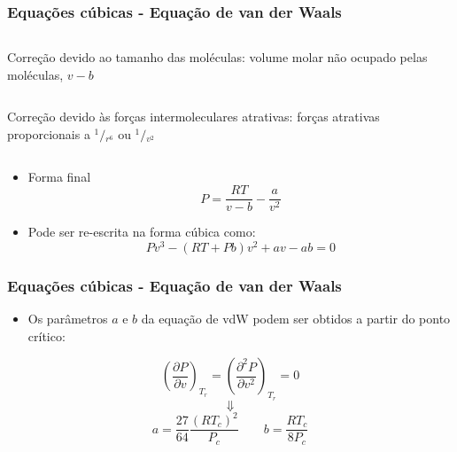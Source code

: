 \documentclass[aspectratio=169]{beamer}
\begin{document}
\begin{frame}
	\frametitle{Equações cúbicas - Equação de van der Waals}
	\begin{columns}
			\begin{exampleblock}{Correção devido ao tamanho das moléculas:}
				volume molar não ocupado pelas moléculas, $v-b$
			\end{exampleblock}
	\end{columns}
	\begin{columns}
		\column{.75\textwidth}
			\begin{exampleblock}{Correção devido às forças intermoleculares
			atrativas:}
			forças atrativas proporcionais a ${}^{1}/{}_{r^6}$ ou
			${}^{1}/{}_{v^2}$
			\end{exampleblock}
	\end{columns}
	\begin{itemize}
		\item Forma final
		\begin{equation*}
		P=\frac{RT}{v-b}-\frac{a}{v^2}
		\end{equation*}
		\item Pode ser re-escrita na forma cúbica como:
		\begin{equation*}
		Pv^3-\left(RT+Pb\right)v^2+av-ab=0
		\end{equation*}
	\end{itemize}
\end{frame}

\begin{frame}
	\frametitle{Equações cúbicas - Equação de van der Waals}
	\begin{itemize}
		\item<1>Os parâmetros $a$ e $b$ da equação de vdW podem ser obtidos a
		partir do ponto crítico: 
	\end{itemize}
	\begin{equation*}
	\left(\frac{\partial P}{\partial v}\right)_{T_r} = \left(\frac{\partial^2
	P}{\partial v^2}\right)_{T_r}=0
	\end{equation*}
	\pause
	\begin{equation*}
	\Downarrow
	\end{equation*}
	\begin{equation*}
	a=\frac{27}{64}\frac{\left(RT_c\right)^2}{P_c} \qquad
	b=\frac{RT_c}{8P_c} 
	\end{equation*}
\end{frame}
\end{document}
